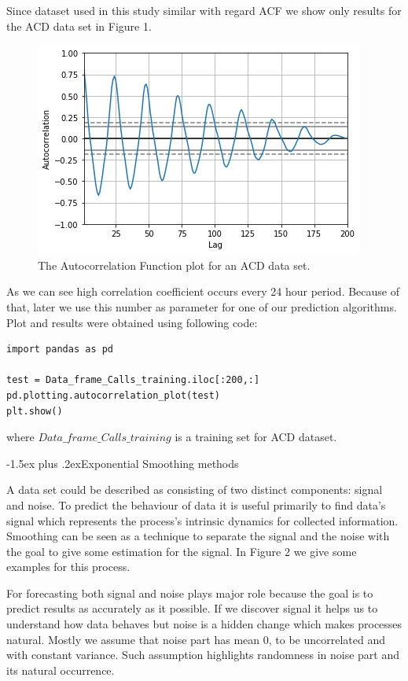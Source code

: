 \documentclass[12pt,a4paper]{article}
\makeatletter
\renewcommand{\subsection}{\@startsection{subsection}{2}{18pt}{3.25ex plus 1ex minus 0.2ex}%
{-1.5ex plus .2ex}{\bfseries\rmfamily\large}}
\theoremstyle{myplain}
\numberwithin{equation}{section}
\makeatother
\begin{document}
Since dataset used in this study similar with regard ACF we show only results for the ACD data set in Figure 1.
\begin{figure}
\includegraphics[scale=1]{ACD_ACF_plot}
\caption{The Autocorrelation Function plot for an ACD data set.}
\end{figure}
As we can see high correlation coefficient occurs every 24 hour period. Because of that, later we use this number as parameter for one of our prediction algorithms. Plot and results were obtained using following code:

\renewcommand{\lstlistingname}{Block of code}
\begin{lstlisting}
import pandas as pd

test = Data_frame_Calls_training.iloc[:200,:]
pd.plotting.autocorrelation_plot(test)
plt.show()
\end{lstlisting}

where $Data\_frame\_Calls\_training$ is a training set for ACD dataset.

\subsection{Exponential Smoothing methods}

A data set could be described as consisting of two distinct components: signal and noise. To predict the behaviour of data it is useful primarily to find data's signal which represents the process's intrinsic dynamics for collected information. Smoothing can be seen as a technique to separate the signal and the noise with the goal to give some estimation for the signal. In Figure 2 we give some examples for this process.

For forecasting both signal and noise plays major role because the goal is to predict results as accurately as it possible. If we discover signal it helps us to understand how data behaves but noise is a hidden change which makes processes natural. Mostly we assume that noise part has mean 0, to be uncorrelated and with constant variance. Such assumption highlights randomness in noise part and its natural occurrence.
\end{document}
